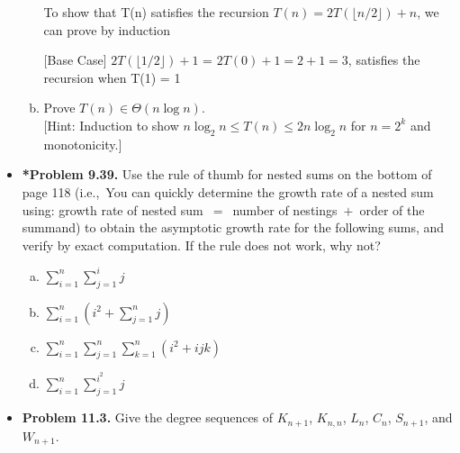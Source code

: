 \documentclass[11pt]{article}
\begin{document}
\begin{itemize}
\begin{enumerate}[(a)]
\vspace*{.1in}

To show that T(n) satisfies the recursion $T(n) = 2T(\lfloor n/2 \rfloor)+n$, we can prove by induction

[Base Case] $2T(\lfloor 1/2 \rfloor) + 1$ = $2T(0) + 1 = 2 + 1 = 3$, satisfies the recursion when T(1) = 1  





\item Prove $T(n)\in\Theta(n\log n)$.\\
$[$Hint: Induction to show $n\log_2 n\le T(n)\le2n\log_2 n$ for $n=2^k$ and monotonicity.$]$
\end{enumerate}

\newpage

\item \textbf{*Problem 9.39.}
Use the rule of thumb for nested sums on the bottom of page 118
(i.e.,~You can quickly determine the growth rate of a nested sum using:
growth rate of nested sum~$=$~number of nestings~$+$~order of the summand)
to obtain the asymptotic growth rate for the following sums, and verify by exact computation.
If the rule does not work, why not?
\begin{multicols}{2}
\begin{enumerate}[(a)]
\item $\displaystyle \sum_{i=1}^n \sum_{j=1}^i j$
\item $\displaystyle \sum_{i=1}^n ( i^2 + \sum_{j=1}^n j )$
\item $\displaystyle \sum_{i=1}^n \sum_{j=1}^n \sum_{k=1}^n (i^2+ijk)$
\item $\displaystyle \sum_{i=1}^n \sum_{j=1}^{i^2} j$
\end{enumerate}
\end{multicols}

\vspace{0.1in}

%

%

\item \textbf{Problem 11.3.}
Give the degree sequences of $K_{n+1}$, $K_{n,n}$, $L_n$, $C_n$, $S_{n+1}$, and $W_{n+1}$.

\vspace{0.1in}


\end{itemize}
\end{document}
